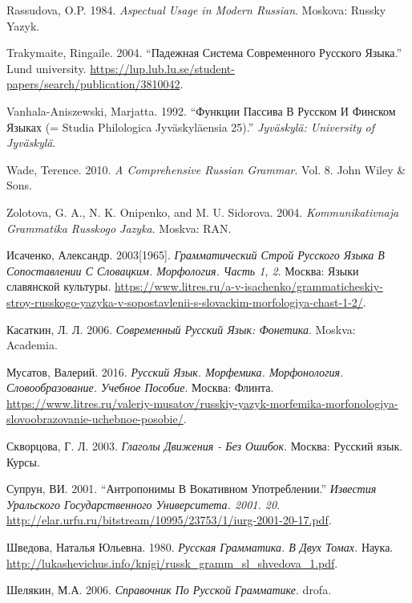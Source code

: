 \documentclass[]{scrartcl}
\begin{document}
Rassudova, O.P. 1984. \emph{Aspectual Usage in Modern Russian}. Moskova:
Russky Yazyk.

Trakymaite, Ringaile. 2004. ``Падежная Система Современного Русского
Языка.'' Lund university.
\url{https://lup.lub.lu.se/student-papers/search/publication/3810042}.

Vanhala-Aniszewski, Marjatta. 1992. ``Функции Пассива В Русском И
Финском Языках (= Studia Philologica Jyväskyläensia 25).''
\emph{Jyväskylä: University of Jyväskylä}.

Wade, Terence. 2010. \emph{A Comprehensive Russian Grammar}. Vol. 8.
John Wiley \& Sons.

Zolotova, G. A., N. K. Onipenko, and M. U. Sidorova. 2004.
\emph{Kommunikativnaja Grammatika Russkogo Jazyka}. Moskva: RAN.

Исаченко, Александр. 2003{[}1965{]}. \emph{Грамматический Строй Русского
Языка В Сопоставлении С Словацким. Морфология. Часть 1, 2}. Москва:
Языки славянской культуры.
\url{https://www.litres.ru/a-v-isachenko/grammaticheskiy-stroy-russkogo-yazyka-v-sopostavlenii-s-slovackim-morfologiya-chast-1-2/}.

Касаткин, Л. Л. 2006. \emph{Современный Русский Язык: Фонетика}. Moskva:
Academia.

Мусатов, Валерий. 2016. \emph{Русский Язык. Морфемика. Морфонология.
Словообразование. Учебное Пособие}. Москва: Флинта.
\url{https://www.litres.ru/valeriy-musatov/russkiy-yazyk-morfemika-morfonologiya-slovoobrazovanie-uchebnoe-posobie/}.

Скворцова, Г. Л. 2003. \emph{Глаголы Движения - Без Ошибок}. Москва:
Русский язык. Курсы.

Супрун, ВИ. 2001. ``Антропонимы В Вокативном Употреблении.''
\emph{Известия Уральского Государственного Университета. 2001. 20}.
\url{http://elar.urfu.ru/bitstream/10995/23753/1/iurg-2001-20-17.pdf}.

Шведова, Наталья Юльевна. 1980. \emph{Русская Грамматика. В Двух Томах.}
Наука.
\url{http://lukashevichus.info/knigi/russk_gramm_sl_shvedova_1.pdf}.

Шелякин, М.А. 2006. \emph{Справочник По Русской Грамматике}. drofa.
\end{document}
